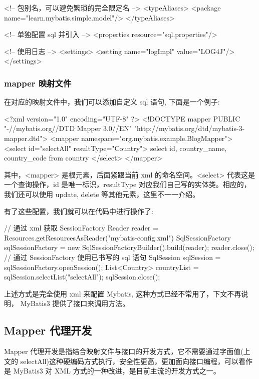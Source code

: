 \begin{xml}
<!-- 包别名，可以避免繁琐的完全限定名 -->
<typeAliases>
    <package name="learn.mybatis.simple.model"/>
</typeAliases>

<!-- 单独配置 sql 并引入 -->
<properties resource="sql.properties"/>

<!-- 使用日志 -->
<settings>
    <setting name="logImpl" value="LOG4J"/>
</settings>
\end{xml}

\subsubsection*{mapper 映射文件}

在对应的映射文件中，我们可以添加自定义 sql 语句, 下面是一个例子:

\begin{xml}
<?xml version="1.0" encoding="UTF-8" ?>
<!DOCTYPE mapper PUBLIC "-//mybatis.org//DTD Mapper 3.0//EN"
        "http://mybatis.org/dtd/mybatis-3-mapper.dtd">
<mapper namespace="org.mybatis.example.BlogMapper">
    <select id="selectAll" resultType="Country">
        select id, country_name, country_code from country
    </select>
</mapper>
\end{xml}

其中，<mapper> 是根元素，后面紧跟当前 xml 的命名空间。<select> 代表这是一个查询操作，id 是唯一标识，resultType 对应我们自己写的实体类。相应的，我们还可以使用 update, delete 等其他元素，这里不一一介绍。

有了这些配置，我们就可以在代码中进行操作了:

\begin{Java}
// 通过 xml 获取 SessionFactory
Reader reader = Resources.getResourcesAsReader("mybatis-config.xml")
SqlSessionFactory sqlSessionFactory = new SqlSessionFactoryBuilder().build(reader);
reader.close();
// 通过 SessionFactory 使用已书写的 sql 语句
SqlSession sqlSession = sqlSessionFactory.openSession();
List<Country> countryList = sqlSession.selectList("selectAll");
sqlSession.close();
\end{Java}

上述方式是完全使用 xml 来配置 Mybatis, 这种方式已经不常用了，下文不再说明， MyBatis3 提供了接口来调用方法。

\subsection{Mapper 代理开发}

Mapper 代理开发是指结合映射文件与接口的开发方式，它不需要通过字面值(上文的 selectAll)这种硬编码方式执行，安全性更高，更加面向接口编程，可以看作是 MyBatis3 对 XML 方式的一种改进，是目前主流的开发方式之一。

